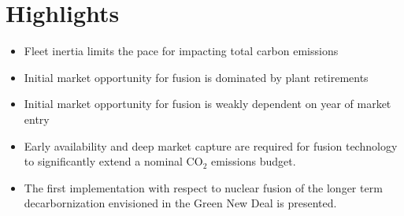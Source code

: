 \documentclass[•]{article}
\begin{document}
\section*{Highlights}
\begin{itemize}
\item Fleet inertia limits the pace for impacting total carbon emissions
\item Initial market opportunity for fusion is dominated by plant retirements 
\item Initial market opportunity for fusion is weakly dependent on year of market entry
\item Early availability and deep market capture  are required for fusion technology to significantly extend a nominal CO$_2$ emissions budget. 
\item The first implementation with respect to nuclear fusion of the longer term decarbornization envisioned in the Green New Deal is presented. 
\end{itemize}
\end{document}

